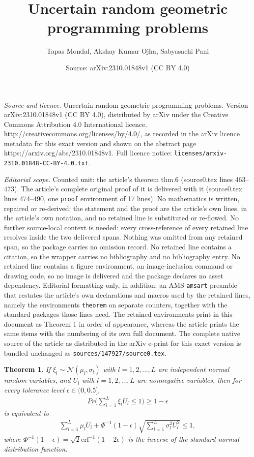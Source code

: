 \documentclass[10pt,a4paper]{amsart}
\title{Uncertain random geometric programming problems}
\author{Tapas Mondal, Akshay Kumar Ojha, Sabyasachi Pani}
\date{Source: arXiv:2310.01848v1 (CC BY 4.0)}
\newtheorem{theorem}{Theorem}
\begin{document}
\maketitle

\noindent\emph{Source and licence.} Uncertain random geometric programming problems. Version arXiv:2310.01848v1 (CC BY 4.0), distributed by arXiv under the Creative Commons Attribution 4.0 International licence, http://creativecommons.org/licenses/by/4.0/, as recorded in the arXiv licence metadata for this exact version and shown on the abstract page https://arxiv.org/abs/2310.01848v1. Full licence notice: \texttt{licenses/arxiv-2310.01848-CC-BY-4.0.txt}.\par\smallskip

\noindent\textit{Editorial scope.} Counted unit: the article's theorem thm.6 (source0.tex lines 463--473). The article's complete original proof of it is delivered with it (source0.tex lines 474--490, one \texttt{proof} environment of 17 lines). No mathematics is written, repaired or re-derived: the statement and the proof are the article's own lines, in the article's own notation, and no retained line is substituted or re-flowed.  No further source-local context is needed: every cross-reference of every retained line resolves inside the two delivered spans.  Nothing was omitted from any retained span, so the package carries no omission record.  No retained line contains a citation, so the wrapper carries no bibliography and no bibliography entry.  No retained line contains a figure environment, an image-inclusion command or drawing code, so no image is delivered and the package declares no asset dependency.  Editorial formatting only, in addition: an AMS \texttt{amsart} preamble that restates the article's own declarations and macros used by the retained lines, namely the environments \texttt{theorem} on separate counters, together with the standard packages those lines need.  The retained environments print in this document as Theorem 1 in order of appearance, whereas the article prints the same items with the numbering of its own full document.  The complete native source of the article as distributed in the arXiv e-print for this exact version is bundled unchanged as \texttt{sources/147927/source0.tex}.
\begin{theorem}\label{thm.6}
		If $\xi_l\sim\mathcal{N}(\mu_l,\sigma_l)$ with $l=1,2,\ldots,L$ are independent normal random variables, and $U_l$ with $l=1,2,\ldots,L$ are nonnegative variables, then for every tolerance level $\epsilon \in(0,0.5]$, 
		\begin{align*}
			Pr\bigg(\sum\limits_{l=1}^{L}\xi_lU_l\le 1\bigg)\ge 1-\epsilon
			\end{align*}
		is equivalent to
		\begin{align*}
			\sum\limits_{l=1}^{L}\mu_lU_l+\Phi^{-1}(1-\epsilon)\sqrt{\sum\limits_{l=1}^{L}\sigma_l^2U_l^2}\le 1,
		\end{align*}
	where $\Phi^{-1}(1-\epsilon)=\sqrt{2}\text{erf}^{-1}(1-2\epsilon)$ is the inverse of the standard normal distribution function.
	\end{theorem}
\end{document}

